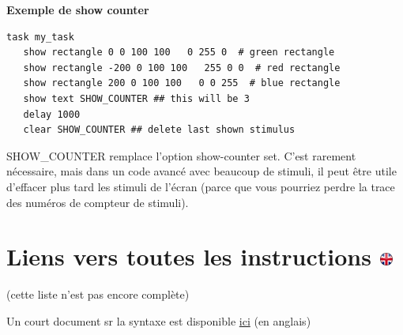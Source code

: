 \documentclass[
]{book}
\begin{document}
\textbf{Exemple de show counter}

\begin{verbatim}
task my_task
   show rectangle 0 0 100 100   0 255 0  # green rectangle
   show rectangle -200 0 100 100   255 0 0  # red rectangle
   show rectangle 200 0 100 100   0 0 255  # blue rectangle
   show text SHOW_COUNTER ## this will be 3
   delay 1000
   clear SHOW_COUNTER ## delete last shown stimulus
\end{verbatim}

SHOW\_COUNTER remplace l'option show-counter set. C'est rarement nécessaire, mais dans un code avancé avec beaucoup de stimuli, il peut être utile d'effacer plus tard les stimuli de l'écran (parce que vous pourriez perdre la trace des numéros de compteur de stimuli).

\hypertarget{liens-vers-toutes-les-instructions}{%
\section[Liens vers toutes les instructions ]{\texorpdfstring{Liens vers toutes les instructions \href{https://www.psytoolkit.org/doc3.4.0/syntax.html\#overview}{\protect\includegraphics{img/ukflag.png}}}{Liens vers toutes les instructions }}\label{liens-vers-toutes-les-instructions}}

(cette liste n'est pas encore complète)

Un court document sr la syntaxe est disponible \href{https://www.psytoolkit.org/doc3.4.0/short_syntax.html}{ici} (en anglais)
\end{document}
